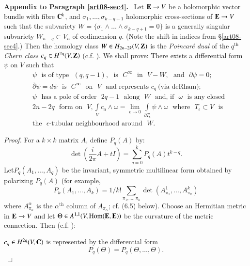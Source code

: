 \medskip
\noindent
{\bf Appendix to Paragraph \ref{art08-sec4}.}~ Let $\mathbf{E}\to V$ be a holomorphic vector bundle with fibre $\mathbf{C}^{k}$, and $\sigma_{1},\ldots,\sigma_{k-q+1}$ holomorphic cross-sections of $\mathbf{E}\to V$ such that the subvariety $W=\{\sigma_{1}\wedge\ldots\wedge \sigma_{k-q+1}=0\}$ is a generally singular subvariety $W_{n-q}\subset V_{n}$ of codimension $q$. (Note the shift in indices from \S\ref{art08-sec4}.) Then the homology class $W\in H_{2n-2k}(V,\mathbf{Z})$ is the {\em Poincar\'e dual} of the $q^{\text{th}}$ {\em Chern class} $c_{q}\in H^{2q}(V,\mathbf{Z})$ (c.f. \cite{art08-key11}). We shall prove: There exists a differential form $\psi$ on $V$ such that
\begin{align*}
& \psi \text{~ is of type~ }(q,q-1), \text{~ is~ } C^{\infty}\text{~ in~ } V-W,\text{~ and~ } \partial \psi=0;\tag{A4.1}\label{art08-sec4-eqA4.1}\\
& \overline{\partial}\psi =d\psi \text{~ is~ } C^{\infty}\text{~ on~ } V\text{~ and represents~} c_{q}~\text{(via deRham)};\tag{A4.2}\label{art08-sec4-eqA4.2}\\
& \psi \text{~ has a pole of order~ } 2q-1\text{~ along~ } W \text{~ and, if~ }\omega \text{~ is any closed}\\
& 2n-2q\text{~ form on~ } V,\int\limits_{V}c_{a}\wedge\omega=\lim\limits_{\epsilon\to 0}\int\limits_{\partial T_{\epsilon}}\psi\wedge \omega\text{~ where~ } T_{\epsilon}\subset V\text{~ is}\\
& \text{the~ }\epsilon\text{-tubular neighbourhood around~ } W.\tag{A4.3}\label{art08-sec4-eqA4.3}
\end{align*}

\begin{proof}
For a $k\times k$ matrix $A$, define $P_{q}(A)$ by:
\begin{equation*}
\det\left(\frac{i}{2\pi}A+tI\right)=\sum\limits^{k}_{q=0}P_{q}(A)t^{k-q}.\tag{A4.4}\label{art08-sec4-eqA4.4}
\end{equation*}
Let\pageoriginale $P_{q}(A_{1},\ldots,A_{q})$ be the invariant, symmetric multilinear form obtained by polarizing $P_{q}(A)$ (for example, 
$$
P_{k}(A_{1},\ldots,A_{k})=1/k!\sum\limits_{\pi_{1},\ldots,\pi_{k}}\det(A^{1}_{\pi_{1}},\ldots,A^{k}_{\pi_{k}})
$$ 
where $A^{\alpha}_{\pi_{\alpha}}$ is the $\alpha^{\text{th}}$ column of $A_{\pi_{\alpha}}$; cf. (6.5) below). Choose an Hermitian metric in $\mathbf{E}\to V$ and let $\Theta\in A^{1,1}(V,\operatorname{\mathrm{Hom}} (\mathbf{E},\mathbf{E}))$ be the curvature of the metric connection. Then (c.f. \cite{art08-key11}):

$c_{q}\in H^{2q}(V,\mathbf{C})$ is represented by the differential form
\begin{equation*}
P_{q}(\Theta)=P_{q}(\Theta,\ldots,\Theta).\tag{A4.5}\label{art08-sec4-eqA4.5}
\end{equation*}
\end{proof}

